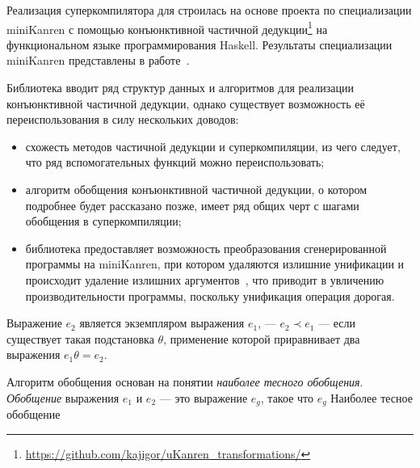 Реализация суперкомпилятора для \ukanren строилась на основе проекта по специализации miniKanren с помощью конъюнктивной частичной
дедукции\footnote{\url{https://github.com/kajigor/uKanren_transformations/}} на функциональном языке программирования Haskell.
Результаты специализации miniKanren представлены в работе~\cite{lozov}.


Библиотека вводит ряд структур данных и алгоритмов для реализации конъюнктивной частичной дедукции,
однако существует возможность её переиспользования в силу нескольких доводов:
\begin{itemize}
\item схожесть методов частичной дедукции и суперкомпиляции\cite{pdAndDriving},
      из чего следует, что ряд вспомогательных функций можно переиспользовать;
\item алгоритм обобщения конъюнктивной частичной дедукции\cite{cpd}, о котором подробнее будет рассказано позже,
      имеет ряд общих черт с шагами обобщения в суперкомпиляции;
\item библиотека предоставляет возможность преобразования сгенерированной программы
      на miniKanren, при котором удаляются излишние унификации и
      происходит удаление излишних аргументов~,
      что приводит в увличению производительности программы, поскольку унификация операция дорогая.
\end{itemize}


Выражение $e_2$ является экземпляром выражения $e_1$, --- $e_2 \prec e_1$ ---
если существует такая подстановка $\theta$, применение которой приравнивает
два выражения $e_1 \theta = e_2$.


Алгоритм обобщения основан на понятии \emph{наиболее тесного обобщения}.
\emph{Обобщение} выражения $e_1$ и $e_2$ --- это выражение $e_g$, такое что
$e_g$ 
Наиболее тесное обобщение  


